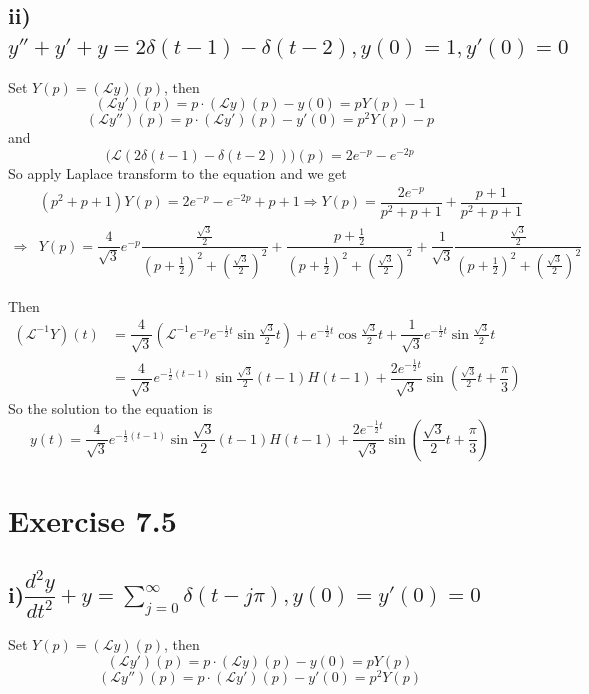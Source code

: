 \documentclass[a4paper,12pt,titlepage]{article}
\begin{document}
\subsection*{ii)$y''+y'+y=2\delta (t-1)-\delta(t-2),y(0)=1,y'(0)=0$}
Set $Y(p)=(\mathcal{L}y)(p)$, then
$$(\mathcal{L}y')(p)=p\cdot(\mathcal{L}y)(p)-y(0)=pY(p)-1 $$
$$(\mathcal{L}y'')(p)=p\cdot(\mathcal{L}y')(p)-y'(0)=p^2Y(p)-p $$
and
$$\Big(\mathcal{L}(2\delta (t-1)-\delta(t-2))\Big)(p)=2e^{-p}-e^{-2 p}$$
So apply Laplace transform to the equation and we get
\begin{align*}
&(p^2+p+1)Y(p)=2e^{-p}-e^{-2 p}+p+1\Rightarrow Y(p)=\dfrac{2e^{-p}}{p^2+p+1}+\dfrac{p+1}{p^2+p+1}\\
\Rightarrow& Y(p)=\dfrac{4}{\sqrt{3}}e^{-p}\dfrac{\frac{\sqrt{3}}{2}}{(p+\frac{1}{2})^2+(\frac{\sqrt{3}}{2})^2}+\dfrac{p+\frac{1}{2}}{(p+\frac{1}{2})^2+(\frac{\sqrt{3}}{2})^2}+\dfrac{1}{\sqrt{3}}\dfrac{\frac{\sqrt{3}}{2}}{(p+\frac{1}{2})^2+(\frac{\sqrt{3}}{2})^2}
\end{align*}

Then 
\begin{align*}
(\mathcal{L}^{-1}Y)(t)&=\dfrac{4}{\sqrt{3}}(\mathcal{L}^{-1}e^{-p}e^{-\frac{1}{2}t}\sin \frac{\sqrt{3}}{2}t)+e^{-\frac{1}{2}t}\cos \frac{\sqrt{3}}{2}t+\dfrac{1}{\sqrt{3}}e^{-\frac{1}{2}t}\sin \frac{\sqrt{3}}{2}t\\
&=\dfrac{4}{\sqrt{3}}e^{-\frac{1}{2}(t-1)}\sin \frac{\sqrt{3}}{2}(t-1)H(t-1)+\dfrac{2e^{-\frac{1}{2}t}}{\sqrt{3}}\sin (\frac{\sqrt{3}}{2}t+\dfrac{\pi}{3})
\end{align*}
So the solution to the equation is $$y(t)=\dfrac{4}{\sqrt{3}}e^{-\frac{1}{2}(t-1)}\sin \frac{\sqrt{3}}{2}(t-1)H(t-1)+\dfrac{2e^{-\frac{1}{2}t}}{\sqrt{3}}\sin (\frac{\sqrt{3}}{2}t+\frac{\pi}{3})$$

\section*{Exercise 7.5}
\subsection*{i)$ \dfrac{d^2y}{dt^2}+y=\sum\limits_{j=0}^{\infty}\delta(t-j\pi),y(0)=y'(0)=0 $}
Set $Y(p)=(\mathcal{L}y)(p)$, then
$$(\mathcal{L}y')(p)=p\cdot(\mathcal{L}y)(p)-y(0)=pY(p) $$
$$(\mathcal{L}y'')(p)=p\cdot(\mathcal{L}y')(p)-y'(0)=p^2Y(p) $$
\end{document}
